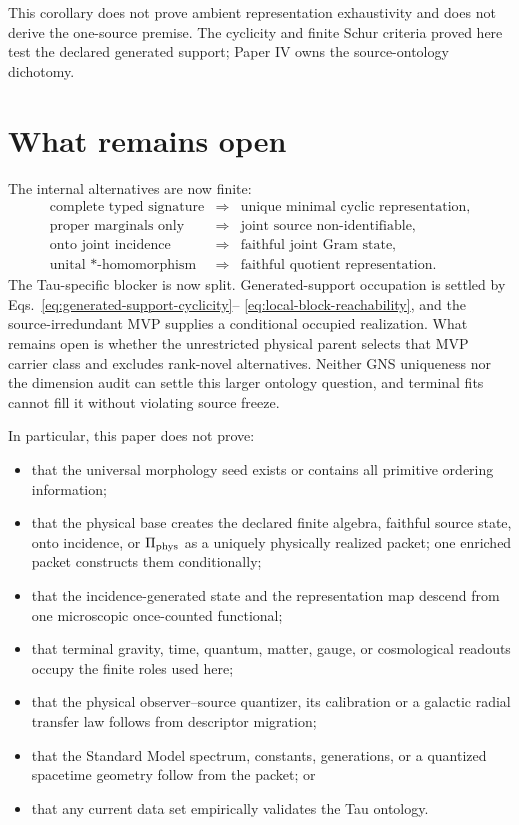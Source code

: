 \documentclass[11pt]{article}
\begin{document}
This corollary does not prove ambient representation exhaustivity and does not
derive the one-source premise. The cyclicity and finite Schur criteria proved
here test the declared generated support; Paper IV owns the source-ontology
dichotomy.

\section{What remains open}

The internal alternatives are now finite:
\begin{equation}
 \begin{array}{ccl}
 \text{complete typed signature}&\Rightarrow&\text{unique minimal cyclic representation},\\
 \text{proper marginals only}&\Rightarrow&\text{joint source non-identifiable},\\
 \text{onto joint incidence}&\Rightarrow&\text{faithful joint Gram state},\\
 \text{unital \(*\)-homomorphism}&\Rightarrow&\text{faithful quotient representation}.
 \end{array}
\end{equation}
The Tau-specific blocker is now split. Generated-support occupation is settled
by Eqs.~\eqref{eq:generated-support-cyclicity}--
\eqref{eq:local-block-reachability}, and the source-irredundant MVP supplies a
conditional occupied realization. What remains open is whether the
unrestricted physical parent selects that MVP carrier class and excludes
rank-novel alternatives. Neither GNS uniqueness nor the dimension audit can
settle this larger ontology question, and terminal fits cannot fill it without
violating source freeze.

In particular, this paper does not prove:
\begin{itemize}
 \item that the universal morphology seed exists or contains all primitive
 ordering information;
 \item that the physical base creates the declared finite algebra, faithful
 source state, onto incidence, or \(\Pi_{\rm phys}\) as a uniquely physically
 realized packet; one enriched packet constructs them conditionally;
 \item that the incidence-generated state and the representation map descend
 from one microscopic once-counted functional;
 \item that terminal gravity, time, quantum, matter, gauge, or cosmological
 readouts occupy the finite roles used here;
 \item that the physical observer--source quantizer, its calibration or a
 galactic radial transfer law follows from descriptor migration;
 \item that the Standard Model spectrum, constants, generations, or a
 quantized spacetime geometry follow from the packet; or
 \item that any current data set empirically validates the Tau ontology.
\end{itemize}
\end{document}
